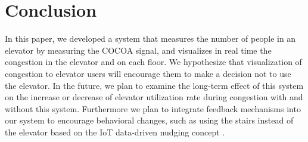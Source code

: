 \section{Conclusion}
In this paper, we developed a system that measures the number of people in an elevator by measuring the COCOA signal, and visualizes in real time the congestion in the elevator and on each floor. We hypothesize that visualization of congestion to elevator users will encourage them to make a decision not to use the elevator. In the future, we plan to examine the long-term effect of this system on the increase or decrease of elevator utilization rate during congestion with and without this system. Furthermore we plan to integrate feedback mechanisms into our system to encourage behavioral changes, such as using the stairs instead of the elevator based on the IoT data-driven nudging concept \cite{nakamura2021iot}.

